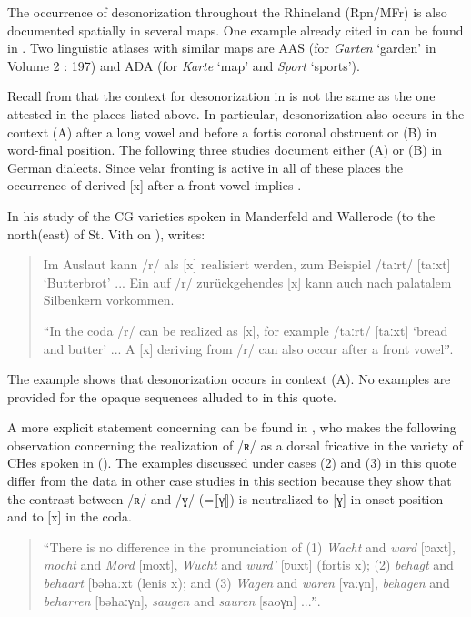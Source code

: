 The occurrence of desonorization throughout the Rhineland (Rpn/MFr) is also documented spatially in several maps. One example already cited in  can be found in \citet{Cornelissen2002}. Two linguistic atlases with similar maps are AAS (for \textit{Garten} ‘garden’ in Volume 2 : 197) and ADA (for \textit{Karte} ‘map’ and \textit{Sport} ‘sports’).

Recall from  that the context for desonorization in  is not the same as the one attested in the places listed above. In particular, desonorization also occurs in the context (A) after a long vowel and before a fortis coronal obstruent or (B) in word-final position. The following three studies document either (A) or (B) in German dialects. Since velar fronting is active in all of these places the occurrence of derived [x] after a front vowel implies .

In his study of the CG varieties spoken in Manderfeld and Wallerode (to the north(east) of St. Vith on ), \citet[67--68]{Hecker1972} writes:

\begin{quote}
Im Auslaut kann /r/ als [x] realisiert werden, zum Beispiel /taːrt/ [taːxt] ‘Butterbrot’ ... Ein auf /r/ zurückgehendes [x] kann auch nach palatalem Silbenkern vorkommen.\smallskip

“In the coda /r/ can be realized as [x], for example /taːrt/ [taːxt] ‘bread and butter’ ... A [x] deriving from /r/ can also occur after a front vowelˮ.
\end{quote}

The example shows that desonorization occurs in context (A). No examples are provided for the opaque sequences alluded to in this quote.

A more explicit statement concerning  can be found in \citet[97]{Freund1910}, who makes the following observation concerning the realization of /ʀ/ as a dorsal fricative in the variety of CHes spoken in  (). The examples discussed under cases (2) and (3) in this quote differ from the data in other case studies in this section because they show that the contrast between /ʀ/ and /ɣ/ (=⟦γ⟧) is neutralized to [ɣ] in onset position and to [x] in the coda.

\begin{quote}
“There is no difference in the pronunciation of
(1) \textit{Wacht} and \textit{ward} [ʋaxt], \textit{mocht} and \textit{Mord} [moxt], \textit{Wucht} and \textit{wurd’} [ʋuxt] (fortis x);
(2) \textit{behagt} and \textit{behaart} [bəhaːxt (lenis x); and
(3) \textit{Wagen} and \textit{waren} [vaːγn], \textit{behagen} and \textit{beharren} [bəhaːγn], \textit{saugen} and \textit{sauren} [saoγn] ...ˮ{.}
\end{quote}

